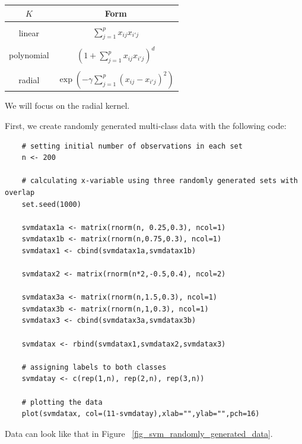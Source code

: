 \documentclass[12pt]{article}
\begin{document}
\begin{center}
    \begin{tabular}{c|c}
        \(K\) & Form \\
        \hline \\
        linear & \(\sum_{j=1}^p x_{ij}x_{i'j}\) \\
          \\

        polynomial & \((1+ \sum_{j=1}^p x_{ij}x_{i'j})^d \) \\
          \\

        radial & \(\exp ( - \gamma \sum_{j=1}^p (x_{ij}-x_{i'j})^2) \)
    \end{tabular}
\end{center}

We will focus on the radial kernel. 

First, we create randomly generated multi-class data with the following code:

\begin{verbatim}
    # setting initial number of observations in each set
    n <- 200

    # calculating x-variable using three randomly generated sets with overlap
    set.seed(1000)

    svmdatax1a <- matrix(rnorm(n, 0.25,0.3), ncol=1)
    svmdatax1b <- matrix(rnorm(n,0.75,0.3), ncol=1)
    svmdatax1 <- cbind(svmdatax1a,svmdatax1b)

    svmdatax2 <- matrix(rnorm(n*2,-0.5,0.4), ncol=2)

    svmdatax3a <- matrix(rnorm(n,1.5,0.3), ncol=1)
    svmdatax3b <- matrix(rnorm(n,1,0.3), ncol=1)
    svmdatax3 <- cbind(svmdatax3a,svmdatax3b)

    svmdatax <- rbind(svmdatax1,svmdatax2,svmdatax3)

    # assigning labels to both classes
    svmdatay <- c(rep(1,n), rep(2,n), rep(3,n))

    # plotting the data
    plot(svmdatax, col=(11-svmdatay),xlab="",ylab="",pch=16)
\end{verbatim}

Data can look like that in Figure ~\ref{fig_svm_randomly_generated_data}.
\end{document}
